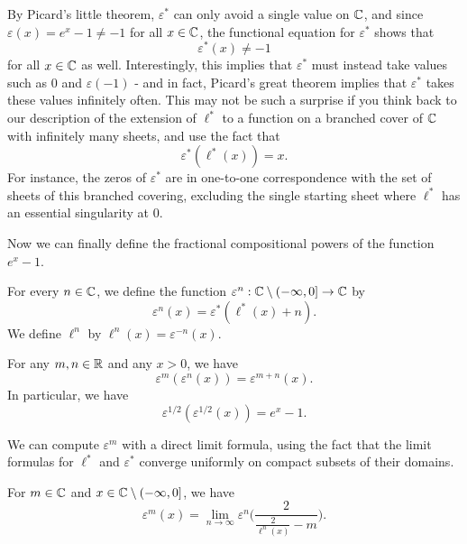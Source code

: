 \documentclass[letterpaper,11pt]{article}
\begin{document}
By Picard's little theorem, $\varepsilon^*$ can only avoid a single value on $\mathbb{C}$, and since $\varepsilon(x) = e^x-1 \ne -1$ for all $x \in \mathbb{C}$, the functional equation for $\varepsilon^*$ shows that
\[
\varepsilon^*(x) \ne -1
\]
for all $x \in \mathbb{C}$ as well. Interestingly, this implies that $\varepsilon^*$ must instead take values such as $0$ and $\varepsilon(-1)$ - and in fact, Picard's great theorem implies that $\varepsilon^*$ takes these values infinitely often. This may not be such a surprise if you think back to our description of the extension of $\ell^*$ to a function on a branched cover of $\mathbb{C}$ with infinitely many sheets, and use the fact that
\[
\varepsilon^*(\ell^*(x)) = x.
\]
For instance, the zeros of $\varepsilon^*$ are in one-to-one correspondence with the set of sheets of this branched covering, excluding the single starting sheet where $\ell^*$ has an essential singularity at $0$.

\begin{comment}
\[
|\frac{d}{dx}\frac{1}{e^{1/x}-1}| = |\frac{e^{1/x}}{x^2(e^{1/x}-1)^2}| < 1?
|e^{1/x}| < |x(e^{1/x}-1)|^2?
1 < |x^2(e^{1/x}-2+e^{-1/x})|?
|e^x + e^{-x} - 2| > |x|^2?
|x^2 + x^4/12 + ...| > |x|^2?
|1 + x^2/12 + ...| > 1?
\]
\end{comment}

Now we can finally define the fractional compositional powers of the function $e^x - 1$.

\begin{defn} For every $n \in \mathbb{C}$, we define the function $\varepsilon^n : \mathbb{C} \setminus (-\infty,0] \rightarrow \mathbb{C}$ by
\[
\varepsilon^n(x) = \varepsilon^*(\ell^*(x) + n).
\]
We define $\ell^n$ by $\ell^n(x) = \varepsilon^{-n}(x)$.
\end{defn}

\begin{prop} For any $m,n \in \mathbb{R}$ and any $x > 0$, we have
\[
\varepsilon^m(\varepsilon^n(x)) = \varepsilon^{m+n}(x).
\]
In particular, we have
\[
\varepsilon^{1/2}(\varepsilon^{1/2}(x)) = e^x - 1.
\]
\end{prop}

We can compute $\varepsilon^m$ with a direct limit formula, using the fact that the limit formulas for $\ell^*$ and $\varepsilon^*$ converge uniformly on compact subsets of their domains.

\begin{prop} For $m \in \mathbb{C}$ and $x \in \mathbb{C} \setminus (-\infty,0]$, we have
\[
\varepsilon^m(x) = \lim_{n \rightarrow \infty} \varepsilon^n\Big(\frac{2}{\frac{2}{\ell^n(x)} - m}\Big).
\]
\end{prop}
\end{document}
